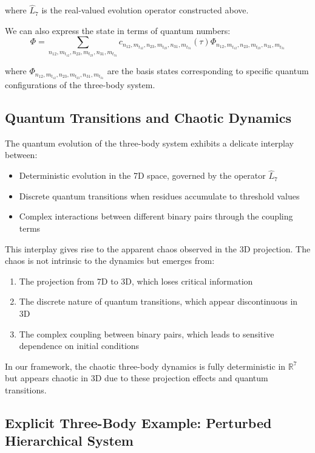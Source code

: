 \documentclass{article}
\begin{document}
where $\hat{L}_7$ is the real-valued evolution operator constructed above.

We can also express the state in terms of quantum numbers:
\begin{equation}
\Phi = \sum_{n_{12},m_{t_{12}},n_{23},m_{t_{23}},n_{31},m_{t_{31}}} c_{n_{12},m_{t_{12}},n_{23},m_{t_{23}},n_{31},m_{t_{31}}}(\tau) \Phi_{n_{12},m_{t_{12}},n_{23},m_{t_{23}},n_{31},m_{t_{31}}}
\end{equation}

where $\Phi_{n_{12},m_{t_{12}},n_{23},m_{t_{23}},n_{31},m_{t_{31}}}$ are the basis states corresponding to specific quantum configurations of the three-body system.

\subsection{Quantum Transitions and Chaotic Dynamics}

The quantum evolution of the three-body system exhibits a delicate interplay between:
\begin{itemize}
\item Deterministic evolution in the 7D space, governed by the operator $\hat{L}_7$
\item Discrete quantum transitions when residues accumulate to threshold values
\item Complex interactions between different binary pairs through the coupling terms
\end{itemize}

This interplay gives rise to the apparent chaos observed in the 3D projection. The chaos is not intrinsic to the dynamics but emerges from:

\begin{enumerate}
\item The projection from 7D to 3D, which loses critical information
\item The discrete nature of quantum transitions, which appear discontinuous in 3D
\item The complex coupling between binary pairs, which leads to sensitive dependence on initial conditions
\end{enumerate}

In our framework, the chaotic three-body dynamics is fully deterministic in $\mathbb{R}^7$ but appears chaotic in 3D due to these projection effects and quantum transitions.

\subsection{Explicit Three-Body Example: Perturbed Hierarchical System}
\end{document}

